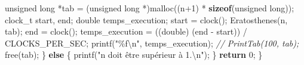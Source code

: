 \documentclass[
    ]{article}
\newenvironment{Shaded}{}{}
\newcommand{\CommentTok}[1]{\textcolor[rgb]{0.38,0.63,0.69}{\textit{#1}}}
\newcommand{\ControlFlowTok}[1]{\textcolor[rgb]{0.00,0.44,0.13}{\textbf{#1}}}
\newcommand{\DataTypeTok}[1]{\textcolor[rgb]{0.56,0.13,0.00}{#1}}
\newcommand{\DecValTok}[1]{\textcolor[rgb]{0.25,0.63,0.44}{#1}}
\newcommand{\KeywordTok}[1]{\textcolor[rgb]{0.00,0.44,0.13}{\textbf{#1}}}
\newcommand{\NormalTok}[1]{#1}
\newcommand{\SpecialCharTok}[1]{\textcolor[rgb]{0.25,0.44,0.63}{#1}}
\newcommand{\StringTok}[1]{\textcolor[rgb]{0.25,0.44,0.63}{#1}}
\begin{document}
\begin{Shaded}
\begin{Highlighting}[]
        \DataTypeTok{unsigned} \DataTypeTok{long}\NormalTok{ *tab = (}\DataTypeTok{unsigned} \DataTypeTok{long}\NormalTok{ *)malloc((n+}\DecValTok{1}\NormalTok{) * }\KeywordTok{sizeof}\NormalTok{(}\DataTypeTok{unsigned} \DataTypeTok{long}\NormalTok{));}
\NormalTok{        clock\_t start, end;}
        \DataTypeTok{double}\NormalTok{ temps\_execution;}
\NormalTok{        start = clock();}
\NormalTok{        Eratosthenes(n, tab);}
\NormalTok{        end = clock();}
\NormalTok{        temps\_execution = ((}\DataTypeTok{double}\NormalTok{) (end {-} start)) / CLOCKS\_PER\_SEC;}
\NormalTok{        printf(}\StringTok{"\%f}\SpecialCharTok{\textbackslash{}n}\StringTok{"}\NormalTok{, temps\_execution);}
        \CommentTok{// PrintTab(100, tab);}
\NormalTok{        free(tab);}
\NormalTok{    \} }\ControlFlowTok{else}\NormalTok{ \{}
\NormalTok{        printf(}\StringTok{"n doit être supérieur à 1.}\SpecialCharTok{\textbackslash{}n}\StringTok{"}\NormalTok{);}
\NormalTok{    \}}
    \ControlFlowTok{return} \DecValTok{0}\NormalTok{;}
\NormalTok{\}}
\end{Highlighting}
\end{Shaded}
\pagebreak
\end{document}

